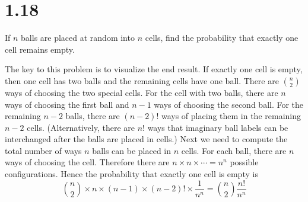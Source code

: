 \section*{1.18}
If $n$ balls are placed at random into $n$ cells, find the probability that
exactly one cell remains empty.

\bigskip
\noindent
The key to this problem is to visualize the end result.
If exactly one cell is empty, then one cell has two balls and the
remaining cells have one ball.
There are $\binom{n}{2}$ ways of choosing the two special cells.
For the cell with two balls, there are $n$ ways of choosing the
first ball and $n-1$ ways of choosing the second ball.
For the remaining $n-2$ balls, there are $(n-2)!$ ways of placing
them in the remaining $n-2$ cells.
(Alternatively, there are $n!$ ways that imaginary
ball labels can be interchanged after the balls are placed in cells.)
Next we need to compute the total number of ways $n$ balls can be
placed in $n$ cells.
For each ball, there are $n$ ways of choosing the cell.
Therefore there are $n\times n\times\cdots=n^n$
possible configurations.
Hence the probability that exactly one cell is empty is
\[
\binom{n}{2}\times n\times (n-1)\times(n-2)!\times\frac{1}{n^n}
=
\binom{n}{2}\frac{n!}{n^n}
\]
